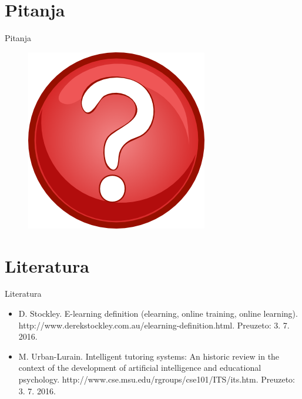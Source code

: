 \documentclass[times, utf8, numeric]{beamer}
\begin{document}
\section{Pitanja}
\begin{frame}{Pitanja}
	\begin{figure}[pitanja]
		\centering
		\includegraphics[width=\textwidth,height=0.7\textheight,keepaspectratio]{img/pitanja.png}
		\label{fig:ER}
	\end{figure}
\end{frame}

\section{Literatura}
\begin{frame}{Literatura}
\begin{itemize}
	\item D. Stockley. E-learning definition (elearning, online training, online learning).
	http://www.derekstockley.com.au/elearning-definition.html. Preuzeto: 3. 7. 2016.
	\item
	M. Urban-Lurain. Intelligent tutoring systems: An historic review in the context
	of the development of artificial intelligence and educational psychology.
	http://www.cse.msu.edu/rgroups/cse101/ITS/its.htm. Preuzeto: 3. 7. 2016.
\end{itemize}
\end{frame}
\end{document}
